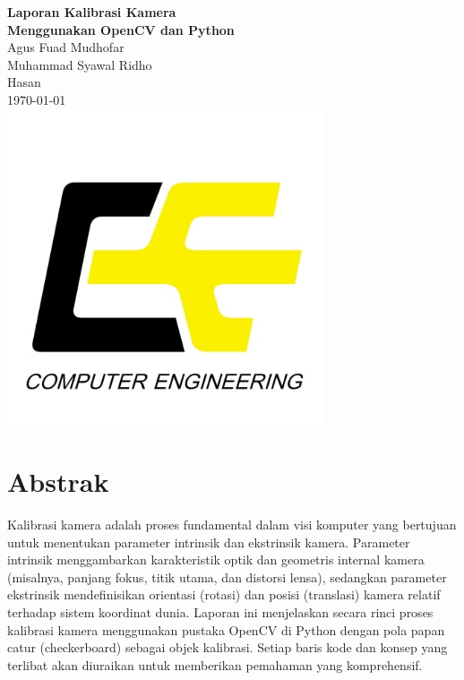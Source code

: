 \documentclass[12pt,a4paper]{article}
\begin{document}

\begin{titlepage}
    \begin{center}
        \vspace*{1cm}
        {\LARGE \textbf{Laporan Kalibrasi Kamera\\Menggunakan OpenCV dan Python}}\\[1.5cm]
        {\large Agus Fuad Mudhofar}\\[0.3cm]
        {\large Muhammad Syawal Ridho}\\[0.3cm]
        {\large Hasan }\\[0.5cm]
        {\large \today}\\
        \includegraphics[width=0.7\textwidth]{Computer-Engineering-1.jpg}\\[1cm]
    \end{center}
\end{titlepage}
\thispagestyle{empty}
\newpage

\tableofcontents
\newpage

\section{Abstrak}
Kalibrasi kamera adalah proses fundamental dalam visi komputer yang bertujuan
untuk menentukan parameter intrinsik dan ekstrinsik kamera. Parameter intrinsik
menggambarkan karakteristik optik dan geometris internal kamera (misalnya,
panjang fokus, titik utama, dan distorsi lensa), sedangkan parameter ekstrinsik
mendefinisikan orientasi (rotasi) dan posisi (translasi) kamera relatif
terhadap sistem koordinat dunia. Laporan ini menjelaskan secara rinci proses
kalibrasi kamera menggunakan pustaka OpenCV di Python dengan pola papan catur
(checkerboard) sebagai objek kalibrasi. Setiap baris kode dan konsep yang
terlibat akan diuraikan untuk memberikan pemahaman yang komprehensif.
\end{document}
